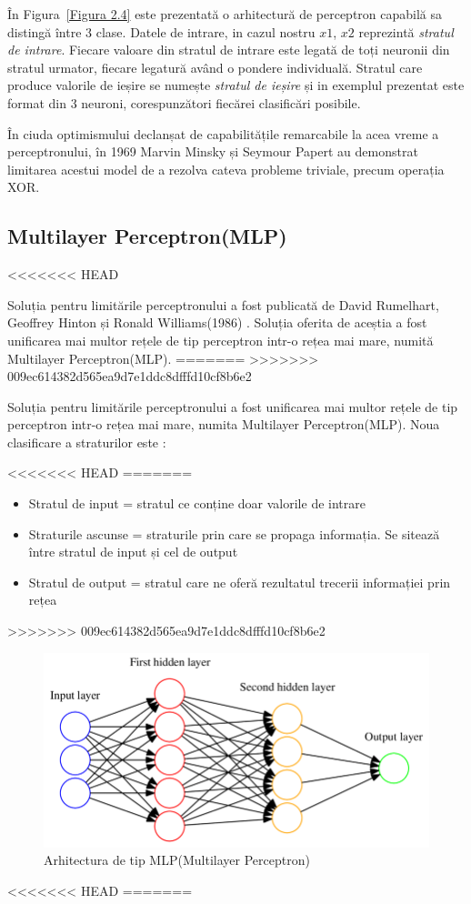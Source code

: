 În Figura~\ref{Figura 2.4} este prezentată o arhitectură de perceptron capabilă sa distingă între 3 clase. Datele de intrare, in cazul nostru $x1$, $x2$ reprezintă \textit{stratul de intrare}. Fiecare valoare din stratul de intrare este legată de toți neuronii din stratul urmator, fiecare legatură având o pondere individuală. Stratul care produce valorile de ieșire se numește \textit{stratul de ieșire} și in exemplul prezentat este format din 3 neuroni, corespunzători fiecărei clasificări posibile. 

În ciuda optimismului declanșat de capabilitățile remarcabile la acea vreme a perceptronului, în 1969 Marvin Minsky și Seymour Papert \cite{minsky1969introduction} au demonstrat limitarea acestui model de a rezolva cateva probleme triviale, precum operația XOR. 

\subsection{Multilayer Perceptron(MLP)}
<<<<<<< HEAD

Soluția pentru limitările perceptronului a fost publicată de David Rumelhart, Geoffrey Hinton și Ronald Williams(1986) \cite{rumelhart1986learning}. Soluția oferita de aceștia a fost unificarea mai multor rețele de tip perceptron intr-o rețea mai mare, numită Multilayer Perceptron(MLP).
=======
>>>>>>> 009ec614382d565ea9d7e1ddc8dfffd10cf8b6e2

Soluția pentru limitările perceptronului a fost unificarea mai multor rețele de tip perceptron intr-o rețea mai mare, numita Multilayer Perceptron(MLP). Noua clasificare a straturilor este :

<<<<<<< HEAD
=======
\begin{itemize}
    \item Stratul de input = stratul ce conține doar valorile de intrare
    \item Straturile ascunse = straturile prin care se propaga informația. Se sitează între stratul de input și cel de output
    \item Stratul de output = stratul care ne oferă rezultatul trecerii informației prin rețea
\end{itemize}


>>>>>>> 009ec614382d565ea9d7e1ddc8dfffd10cf8b6e2
\begin{figure}[h]
         \centering 
         \includegraphics[width=.6\linewidth]{images/MLP.png}
         \captionsetup{font=footnotesize}
         \caption{Arhitectura de tip MLP(Multilayer Perceptron) \cite{phdthesis}}
\end{figure}
<<<<<<< HEAD
=======
    
